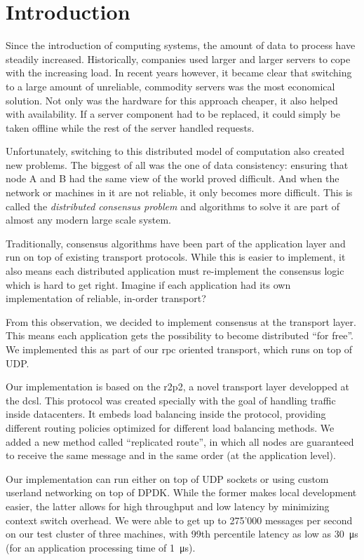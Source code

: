 \chapter{Introduction}

Since the introduction of computing systems, the amount of data to process have steadily increased.
Historically, companies used larger and larger servers to cope with the increasing load.
In recent years however, it became clear that switching to a large amount of unreliable, commodity servers was the most economical solution.
Not only was the hardware for this approach cheaper, it also helped with availability.
If a server component had to be replaced, it could simply be taken offline while the rest of the server handled requests.

Unfortunately, switching to this distributed model of computation also created new problems.
The biggest of all was the one of data consistency: ensuring that node A and B had the same view of the world proved difficult.
And when the network or machines in it are not reliable, it only becomes more difficult.
This is called the \emph{distributed consensus problem} and algorithms to solve it are part of almost any modern large scale system.

Traditionally, consensus algorithms have been part of the application layer and run on top of existing transport protocols.
While this is easier to implement, it also means each distributed application must re-implement the consensus logic which is hard to get right.
Imagine if each application had its own implementation of reliable, in-order transport?

From this observation, we decided to implement consensus at the transport layer.
This means each application gets the possibility to become distributed ``for free''.
We implemented this as part of our \gls{rpc} oriented transport, which runs on top of UDP.

Our implementation is based on the \gls{r2p2}, a novel transport layer developped at the \gls{dcsl}.
This protocol was created specially with the goal of handling traffic inside datacenters.
It embeds load balancing inside the protocol, providing different routing policies optimized for different load balancing methods.
We added a new method called ``replicated route'', in which all nodes are guaranteed to receive the same message and in the same order (at the application level).

Our implementation can run either on top of UDP sockets or using custom userland networking on top of DPDK.
While the former makes local development easier, the latter allows for high throughput and low latency by minimizing context switch overhead.
We were able to get up to 275'000 messages per second on our test cluster of three machines, with 99th percentile latency as low as \SI{30}{\micro\second} (for an application processing time of \SI{1}{\micro\second}).


